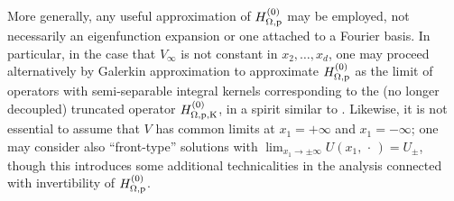 \begin{remark}\label{exp}
More generally, any useful approximation of $H^{(0)}_{\Omega, \rm p}$ may
be employed, not necessarily an eigenfunction expansion or
one attached to a Fourier basis.
In particular, in the case that $V_\infty$ is not constant
in $x_2, \dots, x_d$,
one may proceed alternatively by Galerkin approximation
to approximate $H^{(0)}_{\Omega, \rm p}$ as the limit of operators with 
semi-separable integral kernels 
corresponding to the (no longer decoupled)
truncated operator $H^{(0)}_{\Omega, \rm p, K}$, in a spirit similar to \cite{LPSS00}.
Likewise, it is not essential to assume that $V$ has common
limits at $x_1=+\infty$ and $x_1=-\infty$; one may consider
also ``front-type'' solutions with
$\lim_{x_1\to \pm \infty} U(x_1,{\,\cdot\,})=U_\pm$,
though this introduces some additional technicalities in the analysis
connected with invertibility of $H^{(0)}_{\Omega, \rm p}$.
\end{remark}

